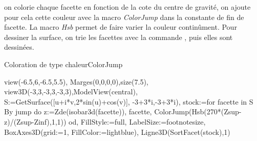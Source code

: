 \exem on colorie chaque facette en fonction de la cote du centre de gravité, on ajoute pour cela cette couleur avec la
macro \textit{ColorJump} dans la constante \jump de fin de facette. La macro \textit{Hsb} permet de faire varier la
couleur continûment. Pour dessiner la surface, on trie les facettes avec la commande ,
puis elles sont dessinées.

\begin{demo}{Coloration de type chaleur}{ColorJump}
\begin{texgraph}[name=ColorJump]
view(-6.5,6,-6.5,5.5),
Marges(0,0,0,0),size(7.5),
view3D(-3,3,-3,3,-3,3),ModelView(central),
S:=GetSurface([u+i*v,2*sin(u)+cos(v)],
               -3+3*i,-3+3*i),
stock:=for facette in S By jump do
   z:=Zde(isobar3d(facette)),
   facette,
   ColorJump(Hsb(270*(Zsup-z)/(Zsup-Zinf),1,1))
        od,
FillStyle:=full, LabelSize:=footnotesize,
BoxAxes3D(grid:=1, FillColor:=lightblue),
Ligne3D(SortFacet(stock),1)
\end{texgraph}
\end{demo}
